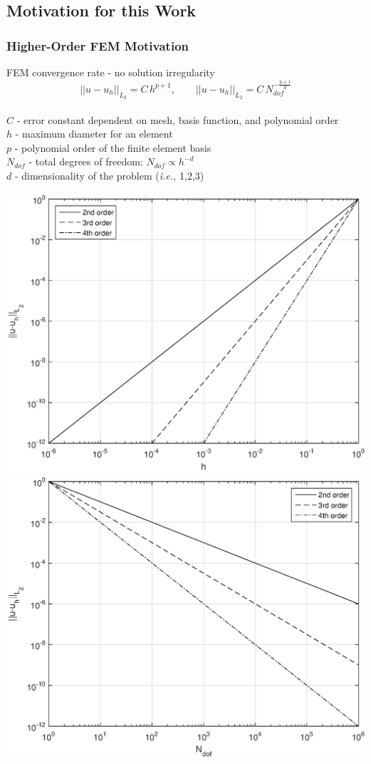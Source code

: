 \documentclass[compress,10pt]{beamer}
\begin{document}
\subsection{Motivation for this Work}
\typeout{***********************************************************************************}
\begin{frame}[t]\frametitle{Higher-Order FEM Motivation}
\vspace{-0.15cm}
\begin{block}{FEM convergence rate - no solution irregularity}{\footnotesize
\begin{equation*}
|| u - u_h ||_{L_2} = C \, h^{p+1}, \qquad || u - u_h ||_{L_2} = C \, N_{dof}^{-\frac{p+1}{d}}
\end{equation*} \\
\vspace{0.1cm}
$C$ - error constant dependent on mesh, basis function, and polynomial order \\
$h$ - maximum diameter for an element \\
$p$ - polynomial order of the finite element basis \\
$N_{dof}$ - total degrees of freedom: $N_{dof} \propto h^{-d}$ \\
$d$ - dimensionality of the problem ({\em i.e.,} 1,2,3)
}
\end{block}
\vspace{-0.05cm}
{}\includegraphics[width=0.485\columnwidth]{images/hconv_larger.eps} \hfill 
{}\includegraphics[width=0.485\columnwidth]{images/Nconv_larger.eps}
\end{frame}
\end{document}
